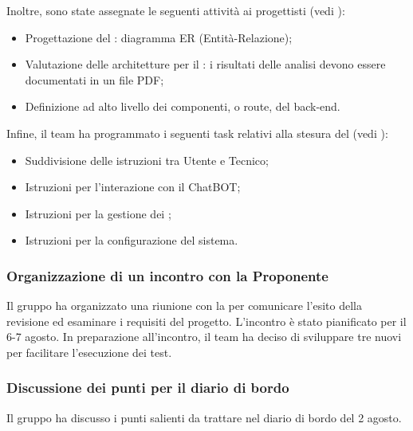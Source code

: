 \vspace{0.5\baselineskip}
\par Inoltre, sono state assegnate le seguenti attività ai progettisti (vedi ):
\begin{itemize}
	\item Progettazione del : diagramma ER (Entità-Relazione);
	\item Valutazione delle architetture per il : i risultati delle analisi devono essere documentati in un file PDF;
	\item Definizione ad alto livello dei componenti, o route, del back-end.
\end{itemize}

\vspace{0.5\baselineskip}
\par Infine, il team ha programmato i seguenti task relativi alla stesura del \MU{} (vedi ):
\begin{itemize}
	\item Suddivisione delle istruzioni tra Utente e Tecnico;
	\item Istruzioni per l'interazione con il ChatBOT;
	\item Istruzioni per la gestione dei ;
	\item Istruzioni per la configurazione del sistema.
\end{itemize}

\subsubsection{Organizzazione di un incontro con la Proponente}
\par Il gruppo ha organizzato una riunione con la  per comunicare l'esito della revisione  ed esaminare i requisiti del progetto. L'incontro è stato pianificato per il 6-7 agosto. In preparazione all'incontro, il team ha deciso di sviluppare tre nuovi  per facilitare l'esecuzione dei test.

\subsubsection{Discussione dei punti per il diario di bordo}
\par Il gruppo ha discusso i punti salienti da trattare nel diario di bordo del 2 agosto.
